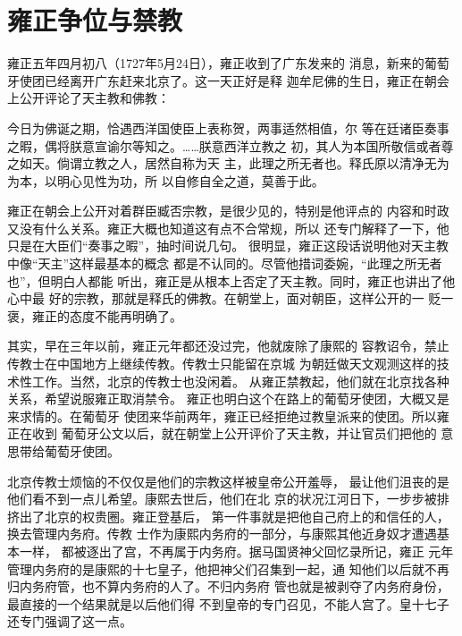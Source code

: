 \section{雍正争位与禁教}
\par
雍正五年四月初八（1727年5月24日），雍正收到了广东发来的%
消息，新来的葡萄牙使团已经离开广东赶来北京了。这一天正好是释%
迦牟尼佛的生日，雍正在朝会上公开评论了天主教和佛教：%
\par
{\bookkai 今日为佛诞之期，恰遇西洋国使臣上表称贺，两事适然相值，尔}%
{\bookkai 等在廷诸臣奏事之暇，偶将朕意宣谕尔等知之。……朕意西洋立教之}%
{\bookkai 初，其人为本国所敬信或者尊之如天。倘谓立教之人，居然自称为天}%
{\bookkai 主，此理之所无者也。释氏原以清净无为为本，以明心见性为功，所}%
{\bookkai 以自修自全之道，莫善于此。}%
\par
雍正在朝会上公开对着群臣臧否宗教，是很少见的，特别是他评点的%
内容和时政又没有什么关系。雍正大概也知道这有点不合常规，所以%
还专门解释了一下，他只是在大臣们“奏事之暇”，抽时间说几句。%
很明显，雍正这段话说明他对天主教中像“天主”这样最基本的概念%
都是不认同的。尽管他措词委婉，“此理之所无者也”，但明白人都能%
听出，雍正是从根本上否定了天主教。同时，雍正也讲出了他心中最%
好的宗教，那就是释氏的佛教。在朝堂上，面对朝臣，这样公开的一%
贬一褒，雍正的态度不能再明确了。%
\par
其实，早在三年以前，雍正元年都还没过完，他就废除了康熙的%
容教诏令，禁止传教士在中国地方上继续传教。传教士只能留在京城%
为朝廷做天文观测这样的技术性工作。当然，北京的传教士也没闲着。%
从雍正禁教起，他们就在北京找各种关系，希望说服雍正取消禁令。%
雍正也明白这个在路上的葡萄牙使团，大概又是来求情的。在葡萄牙%
使团来华前两年，雍正已经拒绝过教皇派来的使团。所以雍正在收到%
葡萄牙公文以后，就在朝堂上公开评价了天主教，并让官员们把他的%
意思带给葡萄牙使团。%
\par
北京传教士烦恼的不仅仅是他们的宗教这样被皇帝公开羞辱，%
最让他们沮丧的是他们看不到一点儿希望。康熙去世后，他们在北%
京的状况江河日下，一步步被排挤出了北京的权贵圈。雍正登基后，%
第一件事就是把他自己府上的和信任的人，换去管理内务府。传教%
士作为康熙内务府的一部分，与康熙其他近身奴才遭遇基本一样，%
都被逐出了宫，不再属于内务府。据马国贤神父回忆录所记，雍正%
元年管理内务府的是康熙的十七皇子，他把神父们召集到一起，通%
知他们以后就不再归内务府管，也不算内务府的人了。不归内务府%
管也就是被剥夺了内务府身份，最直接的一个结果就是以后他们得%
不到皇帝的专门召见，不能人宫了。皇十七子还专门强调了这一点。%
